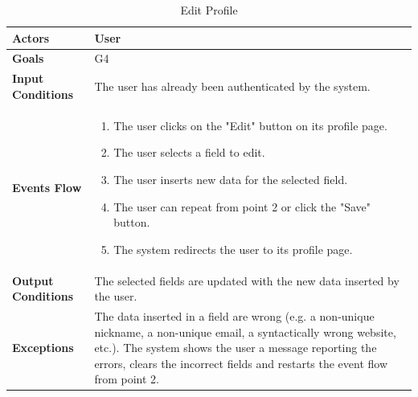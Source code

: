 \begin{table}[H]
	\centering
	\def\arraystretch{1.5}
	\begin{tabular}{|p{7cm}|p{7cm}|}
		\hline
		\textbf{Actors}            & User		    \\ \hline
		\textbf{Goals}             & G4           \\ \hline
		\textbf{Input Conditions}  & The user has already been authenticated by the system.           \\ \hline
		\textbf{Events Flow}       & 
			\begin{enumerate}[topsep=0pt, leftmargin=*]
				\item The user clicks on the "Edit" button on its profile page.
				\item The user selects a field to edit.
				\item The user inserts new data for the selected field.
				\item The user can repeat from point 2 or click the "Save" button.
				\item The system redirects the user to its profile page.
			\end{enumerate}           \\ \hline
		\textbf{Output Conditions} & The selected fields are updated with the new data inserted by the user.          \\ \hline
		\textbf{Exceptions}        &  The data inserted in a field are wrong (e.g. a non-unique nickname, a non-unique email, a syntactically wrong website, etc.). The system shows the user a message reporting the errors, clears the incorrect fields and restarts the event flow from point 2.               \\ \hline
	\end{tabular}
	\caption{Edit Profile}
\end{table}

